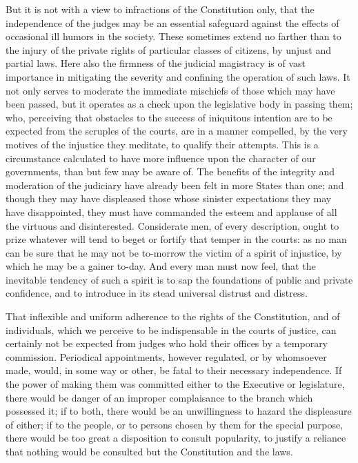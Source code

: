 But it is not with a view to infractions of the Constitution only, that the independence of the judges may be an essential safeguard against the effects of occasional ill humors in the society. 
These sometimes extend no farther than to the injury of the private rights of particular classes of citizens, by unjust and partial laws. 
Here also the firmness of the judicial magistracy is of vast importance in mitigating the severity and confining the operation of such laws. 
It not only serves to moderate the immediate mischiefs of those which may have been passed, but it operates as a check upon the legislative body in passing them; who, perceiving that obstacles to the success of iniquitous intention are to be expected from the scruples of the courts, are in a manner compelled, by the very motives of the injustice they meditate, to qualify their attempts. 
This is a circumstance calculated to have more influence upon the character of our governments, than but few may be aware of. 
The benefits of the integrity and moderation of the judiciary have already been felt in more States than one; and though they may have displeased those whose sinister expectations they may have disappointed, they must have commanded the esteem and applause of all the virtuous and disinterested. 
Considerate men, of every description, ought to prize whatever will tend to beget or fortify that temper in the courts: as no man can be sure that he may not be to-morrow the victim of a spirit of injustice, by which he may be a gainer to-day. 
And every man must now feel, that the inevitable tendency of such a spirit is to sap the foundations of public and private confidence, and to introduce in its stead universal distrust and distress.

That inflexible and uniform adherence to the rights of the Constitution, and of individuals, which we perceive to be indispensable in the courts of justice, can certainly not be expected from judges who hold their offices by a temporary commission. 
Periodical appointments, however regulated, or by whomsoever made, would, in some way or other, be fatal to their necessary independence. 
If the power of making them was committed either to the Executive or legislature, there would be danger of an improper complaisance to the branch which possessed it; if to both, there would be an unwillingness to hazard the displeasure of either; if to the people, or to persons chosen by them for the special purpose, there would be too great a disposition to consult popularity, to justify a reliance that nothing would be consulted but the Constitution and the laws.


